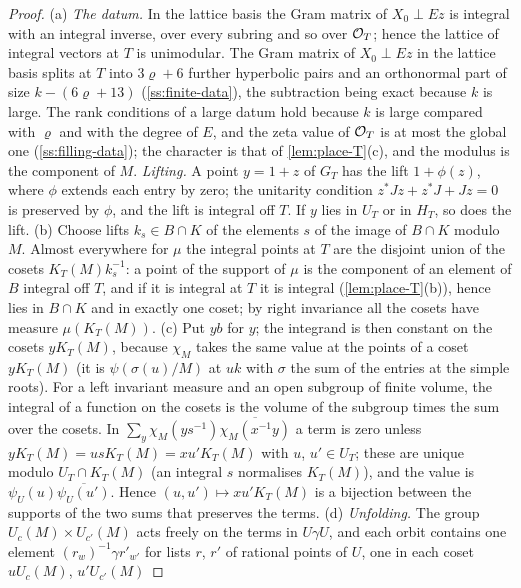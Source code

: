 
\begin{proof}
(a) \emph{The datum.} In the lattice basis the Gram matrix of $X_0\perp Ez$ is integral with an integral inverse, over every
subring and so over $\mathcal{O}_T$; hence the lattice of integral vectors at $T$ is unimodular. The Gram matrix of $X_0\perp Ez$ in the lattice basis splits at $T$ into $3\varrho+6$ further hyperbolic pairs and an orthonormal part of size $k-(6\varrho+13)$ (\cref{ss:finite-data}),
the subtraction being exact because $k$ is large. The rank conditions of a large datum hold because $k$ is large compared with $\varrho$ and with the degree of $E$, and the zeta value of $\mathcal{O}_T$ is at most the global one
(\cref{ss:filling-data}); the character is that of \cref{lem:place-T}(c), and the modulus is the component of $M$. \emph{Lifting.} A point $y=1+z$ of $G_T$ has the lift $1+\phi(z)$, where $\phi$ extends each entry by zero;
the unitarity condition $z^*Jz+z^*J+Jz=0$ is preserved by $\phi$, and the lift is integral off $T$. If $y$ lies in $U_T$ or in $H_T$, so does the lift.
(b) Choose lifts $k_s\in B\cap K$ of the elements $s$ of the image of $B\cap K$ modulo $M$. Almost everywhere for $\mu$ the integral points at $T$ are the disjoint union of the cosets $K_T(M)k_s^{-1}$: a point of the support
of $\mu$ is the component of an element of $B$ integral off $T$, and if it is integral at $T$ it is integral (\cref{lem:place-T}(b)), hence lies in $B\cap K$ and in exactly one coset; by right invariance all the cosets have
measure $\mu(K_T(M))$.
(c) Put $yb$ for $y$; the integrand is then constant on the cosets $yK_T(M)$, because $\chi_M$ takes the same value at the points of a coset $yK_T(M)$ (it is $\psi(\sigma(u)/M)$ at $uk$ with $\sigma$ the sum of the entries at the
simple roots). For a left invariant measure and an open subgroup of finite volume, the integral of a function on the cosets is the volume of the subgroup times the sum over the cosets. In
$\sum_{y}\chi_M(ys^{-1})\overline{\chi_M(x^{-1}y)}$ a term is zero unless $yK_T(M)=usK_T(M)=xu'K_T(M)$ with $u$, $u'\in U_T$; these are unique modulo $U_T\cap K_T(M)$ (an integral $s$ normalises $K_T(M)$), and the value is
$\psi_U(u)\overline{\psi_U(u')}$. Hence $(u,u')\mapsto xu'K_T(M)$ is a bijection between the supports of the two sums that preserves the terms.
(d) \emph{Unfolding.} The group $U_c(M)\times U_{c'}(M)$ acts freely on the terms in $U\gamma U$, and each orbit contains one element $(r_w)^{-1}\gamma r'_{w'}$ for lists $r$, $r'$ of rational points of $U$, one in each coset $uU_c(M)$, $u'U_{c'}(M)$

\end{proof}
